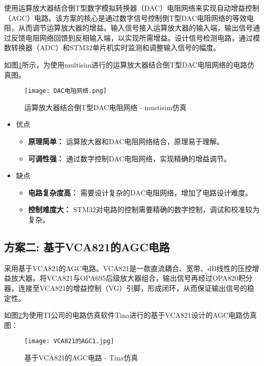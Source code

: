 \documentclass[lang=cn,11pt,a4paper]{elegantpaper}
\begin{document}
使用运算放大器结合倒T型数字模拟转换器（DAC）电阻网络来实现自动增益控制（AGC）电路。该方案的核心是通过数字信号控制倒T型DAC电阻网络的等效电阻，从而调节运算放大器的增益。输入信号接入运算放大器的输入端，输出信号通过反馈电阻网络回馈到反相输入端，以实现所需增益。设计信号检测电路，通过模数转换器（ADC）和STM32单片机实时监测和调整输入信号的幅度。

如图\ref{fig:DAC_net}所示，为使用multisim进行的运算放大器结合倒T型DAC电阻网络的电路仿真图。
\begin{figure}[!htb]
  \centering
  \texttt{[image: DAC电阻网络.png]}
  \caption{运算放大器结合倒T型DAC电阻网络 - mustisim仿真}
  \label{fig:DAC_net}
\end{figure}

\begin{itemize}
  \item 优点
        \begin{itemize}
          \item \textbf{原理简单：} 运算放大器和DAC电阻网络结合，原理易于理解。
          \item \textbf{可调性强：} 通过数字控制DAC电阻网络，实现精确的增益调节。
        \end{itemize}

  \item  缺点
        \begin{itemize}
          \item \textbf{电路复杂度高：} 需要设计复杂的DAC电阻网络，增加了电路设计难度。
          \item \textbf{控制难度大：} STM32对电路的控制需要精确的数字控制，调试和校准较为复杂。
        \end{itemize}
\end{itemize}
\subsection{方案二: 基于VCA821的AGC电路}

采用基于VCA821的AGC电路。VCA821是一款直流耦合、宽带、dB线性的压控增益放大器。将VCA821与OPA695后级放大器组合，输出信号再经过OPA820积分器，连接至VCA821的增益控制（VG）引脚，形成闭环，从而保证输出信号的稳定性。

如图\ref{fig:vca_agc}为使用TI公司的电路仿真软件Tina进行的基于VCA821设计的AGC电路仿真图：
\begin{figure}[!htb]
  \centering
  \texttt{[image: VCA821的AGC1.jpg]}
  \caption{基于VCA821的AGC电路 - Tina仿真}
  \label{fig:vca_agc}
\end{figure}
\end{document}
